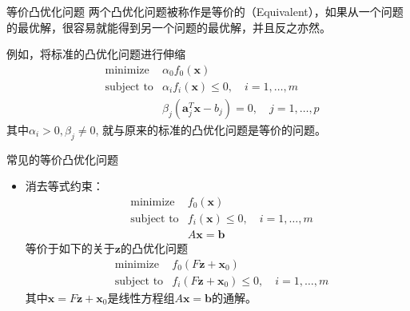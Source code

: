 \documentclass[10pt]{beamer}
\begin{document}
\begin{frame}

\begin{block}{等价凸优化问题}
两个凸优化问题被称作是等价的（Equivalent），如果从一个问题的最优解，很容易就能得到另一个问题的最优解，并且反之亦然。
\end{block}

\vspace{1em}

例如，将标准的凸优化问题进行伸缩
\begin{eqnarray*}
& \text{minimize} & \alpha_0f_0(\mathbf{x}) \\
& \text{subject to} & \alpha_i f_i(\mathbf{x}) \le 0, \quad i = 1,\ldots,m \\
& & \beta_j(\mathbf{a}_j^T\mathbf{x} - b_j) = 0, \quad j = 1,\ldots,p
\end{eqnarray*}
其中$\alpha_i > 0, \beta_j\neq 0$, 就与原来的标准的凸优化问题是等价的问题。
\end{frame}


\begin{frame}

\begin{block}{常见的等价凸优化问题}
\begin{itemize}
\item 消去等式约束：
\begin{eqnarray*}
& \text{minimize} & f_0(\mathbf{x}) \\
& \text{subject to} & f_i(\mathbf{x}) \le 0, \quad i = 1,\ldots,m \\
& & A\mathbf{x} = \mathbf{b}
\end{eqnarray*}
等价于如下的关于$\mathbf{z}$的凸优化问题
\begin{eqnarray*}
& \text{minimize} & f_0(F\mathbf{z} + \mathbf{x}_0) \\
& \text{subject to} & f_i(F\mathbf{z} + \mathbf{x}_0) \le 0, \quad i = 1,\ldots,m
\end{eqnarray*}
其中$\mathbf{x} = F\mathbf{z} + \mathbf{x}_0$是线性方程组$A\mathbf{x} = \mathbf{b}$的通解。
\end{itemize}
\end{block}

\end{frame}

\end{document}

